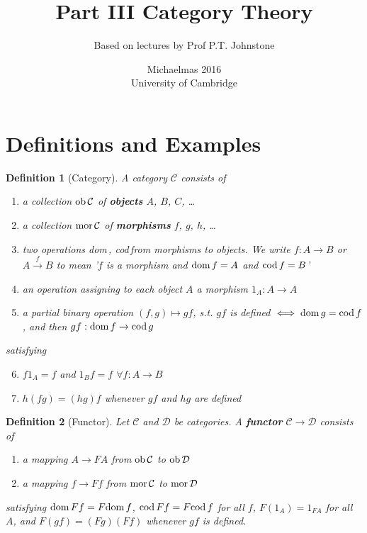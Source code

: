 \documentclass[a4paper]{article}
\title{Part III Category Theory}
\author{Based on lectures by Prof P.T. Johnstone}
\date{Michaelmas 2016\\University of Cambridge}
\newtheorem*{definition}{Definition}
\newcommand*\dom[1]{\textnormal{dom}\,#1}
\newcommand*\cod[1]{\textnormal{cod}\,#1}
\newcommand*\ob[1]{\textnormal{ob}\,#1}
\newcommand*\mor[1]{\textnormal{mor}\,#1}
\begin{document}
\maketitle
\tableofcontents

\section{Definitions and Examples}
\begin{definition}[Category]
	A category $\mathcal{C}$ consists of 
	\begin{enumerate}[label=\alph*.]
		\item a collection $\ob{\mathcal{C}}$ of \textbf{objects} $A$, $B$, $C$, \dots
		\item a collection $\mor{\mathcal{C}}$ of \textbf{morphisms} $f$, $g$, $h$, \dots
		\item two operations \dom, \cod from morphisms to objects. We write $f:A\to B$ or $A\overset{f}{\to}B$ to mean '$f$ is a morphism and $\dom{f}=A$ and $\cod{f}=B$'
		\item an operation assigning to each object $A$ a morphism $1_A:A\to A$
		\item a partial binary operation $(f, g) \mapsto gf$, s.t. $gf$ is defined $\iff \dom{g}=\cod{f}$, and then $gf:\dom{f}\to\cod{g}$
	\end{enumerate}
	satisfying
	\begin{enumerate}[label=\alph*.]
		\setcounter{enumi}{5}
		\item $f 1_A = f$ and $1_B f=f$ $\forall f: A \to B$
		\item $h(fg) = (hg)f$ whenever $gf$ and $hg$ are defined
	\end{enumerate}
\end{definition}

\begin{definition}[Functor]
	Let $\mathcal{C}$ and $\mathcal{D}$ be categories. A \textbf{functor} $\mathcal{C}\to\mathcal{D}$ consists of
	\begin{enumerate}[label=\alph*.]
		\item a mapping $A \to FA$ from $\ob{\mathcal{C}}$ to $\ob{\mathcal{D}}$
		\item a mapping $f \to Ff$ from $\mor{\mathcal{C}}$ to $\mor{\mathcal{D}}$
	\end{enumerate}
	satisfying $\dom{Ff}=F\dom{f}$, $\cod{Ff}=F\cod{f}$ for all $f$, $F(1_A)=1_{FA}$ for all $A$, and $F(gf)=(Fg)(Ff)$ whenever $gf$ is defined.
\end{definition}
\end{document}
